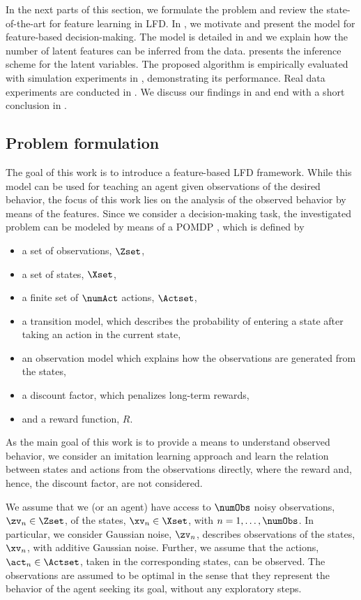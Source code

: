 \documentclass{article}
\begin{document}
In the next parts of this section, we formulate the problem and review the state-of-the-art for feature learning in \ac{LFD}. 
In , we motivate and present the model for feature-based decision-making. 
The model is detailed in  and we explain how the number of latent features can be inferred from the data. 
 presents the inference scheme for the latent variables. 
The proposed algorithm is empirically evaluated with simulation experiments in , demonstrating its performance.
Real data experiments are conducted in .
We discuss our findings in  and end with a short conclusion in .


\subsection{Problem formulation}
The goal of this work is to introduce a feature-based \ac{LFD} framework. 
While this model can be used for teaching an agent given observations of the desired behavior, the focus of this work lies on the analysis of the observed behavior by means of the features.
Since we consider a decision-making task, the investigated problem can be modeled by means of a \ac{POMDP} \cite{Kaelbling1998,Smallwood1973}, which is defined by
\begin{itemize}  
  \item a set of observations, $\Zset$,
  \item a set of states, $\Xset$,
  \item a finite set of $\numAct$ actions, $\Actset$, 
  \item a transition model, which describes the probability of entering a state after taking an action in the current state,
  \item an observation model which explains how the observations are generated from the states,
  \item a discount factor, which penalizes long-term rewards,
  \item and a reward function, $R$. 
\end{itemize}
As the main goal of this work is to provide a means to understand observed behavior, we consider an imitation learning approach and learn the relation between states and actions from the observations directly, where the reward and, hence, the discount factor, are not considered. 

We assume that we (or an agent) have access to $\numObs$ noisy observations, $\zv_n \in \Zset$, of the states, $\xv_n \in \Xset$, with $n=1,\ldots,\numObs$. In particular, we consider Gaussian noise, \ie $\zv_n$, describes observations of the states, $\xv_n$, with additive Gaussian noise. Further, we assume that the actions, $\act_n \in \Actset$,  taken in the corresponding states, can be observed.
The observations are assumed to be optimal in the sense that they represent the behavior of the agent seeking its goal, \ie without any exploratory steps.
\end{document}
